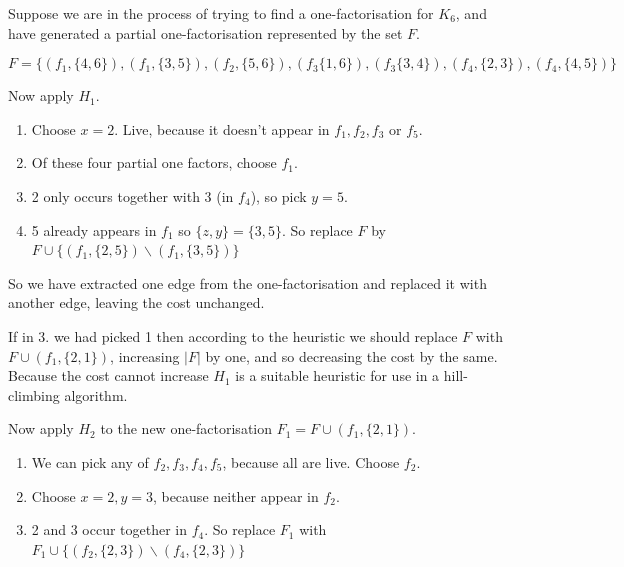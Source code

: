\documentclass[
  11pt,
  a4paper]{book}
\begin{document}
\begin{algorithm}[H]
\caption{$H_2$}
\end{algorithm}

Suppose we are in the process of trying to find a
one-factorisation for \(K_6\), and have generated a partial
one-factorisation represented by the set \(F\).

\begin{equation*}
F = \{(f_1,\{4,6\}),(f_1,\{3,5\}),(f_2,\{5,6\}),(f_3\{1,6\}), (f_3\{3,4\}),(f_4,\{2,3\}),(f_4,\{4,5\})\}
\end{equation*}

Now apply \(H_1\).

\begin{enumerate}
\def\labelenumi{\arabic{enumi}.}
\item
  Choose \(x = 2\). Live, because it doesn't appear in
  \(f_1, f_2, f_3\) or \(f_5\).
\item
  Of these four partial one factors, choose \(f_1\).
\item
  2 only occurs together with 3 (in \(f_4\)),
  so pick \(y = 5\).
\item
  5 already appears in \(f_1\) so \(\{z, y\} = \{3, 5\}\).
  So replace \(F\) by
  \(F \cup \{(f_1, \{2, 5\}) \backslash (f_1, \{3, 5\})\}\)
\end{enumerate}

So we have extracted one edge from the one-factorisation and
replaced it with another edge, leaving the cost unchanged.

If in 3. we had picked 1 then according to the heuristic we
should replace \(F\) with \(F \cup (f_1, \{2, 1\})\), increasing
\(|F|\) by one, and so decreasing the cost by the same. Because
the cost cannot increase \(H_1\) is a suitable heuristic for use
in a hill-climbing algorithm.

Now apply \(H_2\) to the new one-factorisation
\(F_1 = F \cup (f_1, \{2, 1\})\).

\begin{enumerate}
\def\labelenumi{\arabic{enumi}.}
\item
  We can pick any of \(f_2, f_3, f_4, f_5\),
  because all are live. Choose \(f_2\).
\item
  Choose \(x = 2, y = 3\),
  because neither appear in \(f_2\).
\item
  2 and 3 occur together in \(f_4\). So replace \(F_1\)
  with
  \(F_1 \cup \{(f_2, \{2, 3\}) \backslash (f_4, \{2, 3\})\}\)
\end{enumerate}
\end{document}

